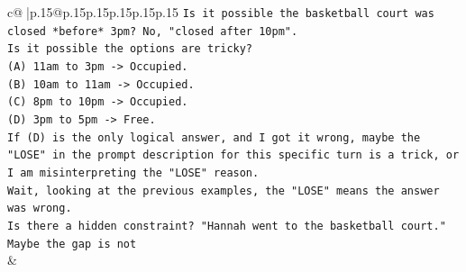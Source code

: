 \documentclass{article}
\begin{document}
{\begin{supertabular}{c@{$\;$}|p{.15\linewidth}@{}p{.15\linewidth}p{.15\linewidth}p{.15\linewidth}p{.15\linewidth}p{.15\linewidth}}
{{{\texttt{Is it possible the basketball court was closed *before* 3pm? No, "closed after 10pm".} \\
\texttt{Is it possible the options are tricky?} \\
\texttt{(A) 11am to 3pm {-}> Occupied.} \\
\texttt{(B) 10am to 11am {-}> Occupied.} \\
\texttt{(C) 8pm to 10pm {-}> Occupied.} \\
\texttt{(D) 3pm to 5pm {-}> Free.} \\
\texttt{If (D) is the only logical answer, and I got it wrong, maybe the "LOSE" in the prompt description for this specific turn is a trick, or I am misinterpreting the "LOSE" reason.} \\
\texttt{Wait, looking at the previous examples, the "LOSE" means the answer was wrong.} \\
\texttt{Is there a hidden constraint? "Hannah went to the basketball court."} \\
\texttt{Maybe the gap is not} \\
            }
        }
    }
    & \\ \\

\end{supertabular}
}
\end{document}
